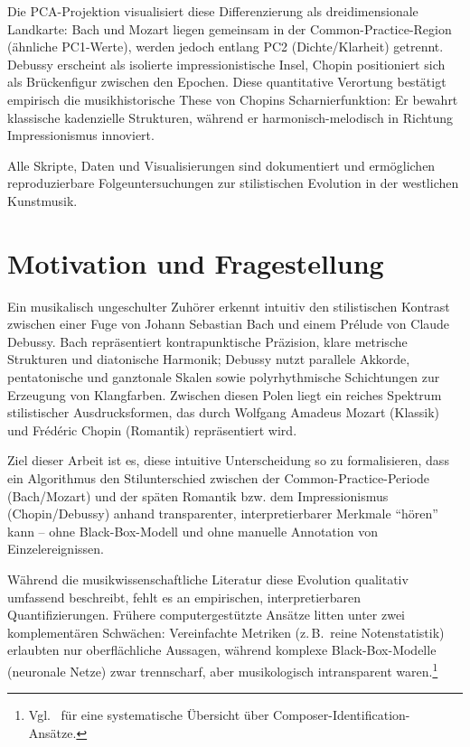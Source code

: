 \documentclass[12pt,a4paper]{article}
\theoremstyle{definition}
\begin{document}
Die PCA-Projektion visualisiert diese Differenzierung als dreidimensionale Landkarte: Bach und Mozart liegen gemeinsam in der Common-Practice-Region (ähnliche PC1-Werte), werden jedoch entlang PC2 (Dichte/Klarheit) getrennt. Debussy erscheint als isolierte impressionistische Insel, Chopin positioniert sich als Brückenfigur zwischen den Epochen. Diese quantitative Verortung bestätigt empirisch die musikhistorische These von Chopins Scharnierfunktion: Er bewahrt klassische kadenzielle Strukturen, während er harmonisch-melodisch in Richtung Impressionismus innoviert.

Alle Skripte, Daten und Visualisierungen sind dokumentiert und ermöglichen reproduzierbare Folgeuntersuchungen zur stilistischen Evolution in der westlichen Kunstmusik.

\section{Motivation und Fragestellung}
Ein musikalisch ungeschulter Zuhörer erkennt intuitiv den stilistischen Kontrast zwischen einer Fuge von Johann Sebastian Bach und einem Prélude von Claude Debussy. Bach repräsentiert kontrapunktische Präzision, klare metrische Strukturen und diatonische Harmonik; Debussy nutzt parallele Akkorde, pentatonische und ganztonale Skalen sowie polyrhythmische Schichtungen zur Erzeugung von Klangfarben. Zwischen diesen Polen liegt ein reiches Spektrum stilistischer Ausdrucksformen, das durch Wolfgang Amadeus Mozart (Klassik) und Frédéric Chopin (Romantik) repräsentiert wird.

Ziel dieser Arbeit ist es, diese intuitive Unterscheidung so zu formalisieren, dass ein Algorithmus den Stilunterschied zwischen der Common-Practice-Periode (Bach/Mozart) und der späten Romantik bzw. dem Impressionismus (Chopin/Debussy) anhand transparenter, interpretierbarer Merkmale \enquote{hören} kann -- ohne Black-Box-Modell und ohne manuelle Annotation von Einzelereignissen.

Während die musikwissenschaftliche Literatur diese Evolution qualitativ umfassend beschreibt, fehlt es an empirischen, interpretierbaren Quantifizierungen. Frühere computergestützte Ansätze litten unter zwei komplementären Schwächen: Vereinfachte Metriken (z.\,B.\ reine Notenstatistik) erlaubten nur oberflächliche Aussagen, während komplexe Black-Box-Modelle (neuronale Netze) zwar trennscharf, aber musikologisch intransparent waren.\footnote{Vgl.\ \cite{Simonetta2025} für eine systematische Übersicht über Composer-Identification-Ansätze.}
\end{document}
